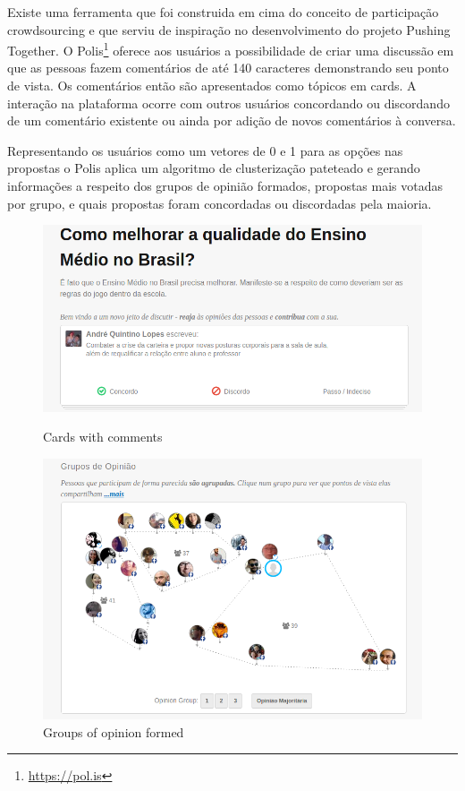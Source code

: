 \documentclass{llncs}
\begin{document}
 Existe uma ferramenta que foi construida em cima do conceito de participação
 crowdsourcing e que serviu de inspiração no desenvolvimento do projeto Pushing
 Together. O Polis\footnote{\url{https://pol.is}} oferece aos usuários a possibilidade
 de criar uma discussão em que as pessoas fazem comentários de
 até 140 caracteres demonstrando seu ponto de vista. Os comentários então são
 apresentados como tópicos em cards. A interação na plataforma ocorre com outros
 usuários concordando ou discordando de um comentário existente ou ainda por
 adição de novos comentários à conversa.

 Representando os usuários como um vetores de 0 e 1 para as opções nas propostas
 o Polis aplica um algoritmo de clusterização pateteado e gerando informações
 a respeito dos grupos de opinião formados, propostas mais votadas por grupo, e
 quais propostas foram concordadas ou discordadas pela maioria.

 \begin{figure}[H]
   \centering
   \begin{minipage}{.50\textwidth}
     \includegraphics[width=.9\linewidth]{images/polis1.png}
     \caption{Cards with comments}
     \label{fig:polis-2}
   \end{minipage}
   \begin{minipage}{.49\textwidth}
     \includegraphics[width=.9\linewidth]{images/polis2.png}
     \caption{Groups of opinion formed}
     \label{fig:polis-1}
   \end{minipage}
 \end{figure}
\end{document}
